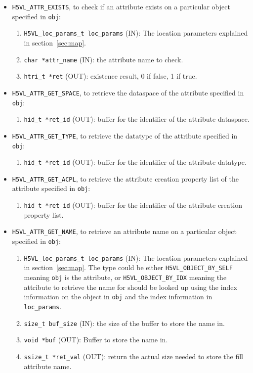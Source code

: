 \begin{itemize}
\item {\tt H5VL\_ATTR\_EXISTS}, to check if an attribute exists on a
  particular object specified in {\tt obj}:
  \begin{enumerate}
  \item {\tt H5VL\_loc\_params\_t loc\_params} (IN): The location parameters
    explained in section~\ref{sec:map}.
  \item {\tt char *attr\_name} (IN): the attribute name to check.
  \item {\tt htri\_t *ret} (OUT): existence result, 0 if false, 1 if true.
  \end{enumerate}

\item {\tt H5VL\_ATTR\_GET\_SPACE}, to retrieve the dataspace of the
  attribute specified in {\tt obj}:
  \begin{enumerate}
  \item {\tt hid\_t *ret\_id} (OUT): buffer for the identifier of the
    attribute dataspace.
  \end{enumerate}

\item {\tt H5VL\_ATTR\_GET\_TYPE}, to retrieve the datatype of the
  attribute specified in {\tt obj}:
  \begin{enumerate}
  \item {\tt hid\_t *ret\_id} (OUT): buffer for the identifier of the
    attribute datatype.
  \end{enumerate}

\item {\tt H5VL\_ATTR\_GET\_ACPL}, to retrieve the attribute creation
  property list of the attribute specified in {\tt obj}:
  \begin{enumerate}
  \item {\tt hid\_t *ret\_id} (OUT): buffer for the identifier of the
    attribute creation property list.
  \end{enumerate}

\item {\tt H5VL\_ATTR\_GET\_NAME}, to retrieve an attribute name on a
  particular object specified in {\tt obj}:
  \begin{enumerate}
  \item {\tt H5VL\_loc\_params\_t loc\_params} (IN): The location parameters
    explained in section~\ref{sec:map}. The type could be either
    {\tt H5VL\_OBJECT\_BY\_SELF} meaning {\tt obj} is the attribute,
    or {\tt H5VL\_OBJECT\_BY\_IDX} meaning the attribute to retrieve
    the name for should be looked up using the index information on
    the object in {\tt obj} and the index information in {\tt loc\_params}.
  \item {\tt size\_t buf\_size} (IN): the size of the buffer to store
    the name in.
  \item {\tt void *buf} (OUT): Buffer to store the name in.
  \item {\tt ssize\_t *ret\_val} (OUT): return the actual size needed
    to store the fill attribute name.
  \end{enumerate}


\end{itemize}
